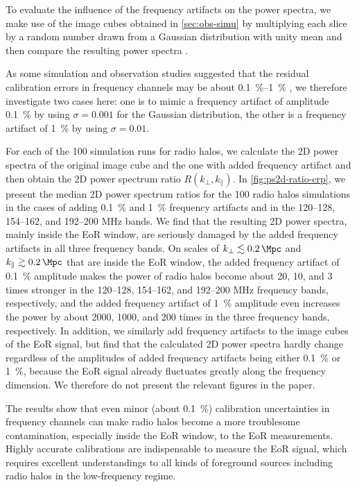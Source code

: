 \documentclass[modern]{aastex62}
\newcommand{\klos}{\text{$k_{\parallel}$}}
\newcommand{\kperp}{\text{$k_{\bot}$}}
\begin{document}
To evaluate the influence of the frequency artifacts on the power
spectra, we make use of the image cubes obtained in
\autoref{sec:obs-simu} by multiplying each slice by a random number
drawn from a Gaussian distribution with unity mean and then compare
the resulting power spectra \citep{chapman2016}.
{\color{cyan}%
As some simulation and observation studies suggested that the residual
calibration errors in frequency channels may be about
\SIrange[range-units=repeat]{0.1}{1}{\percent}
\citep[e.g.,][]{barry2016,beardsley2016,ewallWice2017},
we therefore investigate two cases here:
one is to mimic a frequency artifact of amplitude \SI{0.1}{\percent} by
using $\sigma = 0.001$ for the Gaussian distribution, the other is a
frequency artifact of \SI{1}{\percent} by using $\sigma = 0.01$.

For each of the 100 simulation runs for radio halos, we calculate the
2D power spectra of the original image cube and the one with added
frequency artifact and then obtain the 2D power spectrum ratio
$R(\kperp, \klos)$.
In \autoref{fig:ps2d-ratio-crp}, we present the median 2D power spectrum
ratios for the 100 radio halos simulations in the cases of adding
\SI{0.1}{\percent} and \SI{1}{\percent} frequency artifacts and in the
\numrange{120}{128}, \numrange{154}{162}, and \numrange{192}{200}
\si{\MHz} bands.
We find that the resulting 2D power spectra, mainly inside the EoR
window, are seriously damaged by the added frequency artifacts in all
three frequency bands.
On scales of $\kperp \lesssim \SI{0.2}{\per\Mpc}$ and
$\klos \gtrsim \SI{0.2}{\per\Mpc}$ that are inside the EoR window,
the added frequency artifact of \SI{0.1}{\percent} amplitude makes the
power of radio halos become about 20, 10, and 3 times stronger
in the \numrange{120}{128}, \numrange{154}{162},
and \numrange{192}{200} \si{\MHz} frequency bands, respectively,
and the added frequency artifact of \SI{1}{\percent} amplitude even
increases the power by about 2000, 1000, and 200 times in the three
frequency bands, respectively.
In addition, we similarly add frequency artifacts to the image cubes of
the EoR signal, but find that the calculated 2D power spectra hardly
change regardless of the amplitudes of added frequency artifacts being
either \SI{0.1}{\percent} or \SI{1}{\percent}, because the EoR signal
already fluctuates greatly along the frequency dimension.
We therefore do not present the relevant figures in the paper.

The results show that even minor (about \SI{0.1}{\percent}) calibration
uncertainties in frequency channels can make radio halos become a more
troublesome contamination, especially inside the EoR window, to the EoR
measurements.
Highly accurate calibrations are indispensable to measure the EoR signal,
which requires excellent understandings to all kinds of foreground sources
including radio halos in the low-frequency regime.
} %
\end{document}
